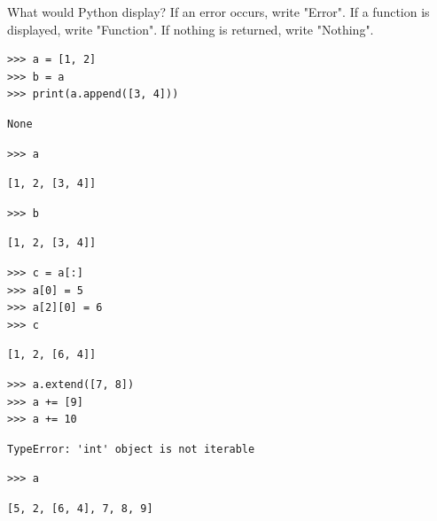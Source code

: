 \begin{blocksection}
\question What would Python display? If an error occurs, write "Error". If a function is displayed, write "Function". If nothing is returned, write "Nothing".

\begin{lstlisting}
>>> a = [1, 2]
>>> b = a
>>> print(a.append([3, 4]))
\end{lstlisting}
\begin{solution}[0.25in]
\begin{lstlisting}
None
\end{lstlisting}
\end{solution}

\begin{lstlisting}
>>> a
\end{lstlisting}
\begin{solution}[0.25in]
\begin{lstlisting}
[1, 2, [3, 4]]
\end{lstlisting}
\end{solution}

\begin{lstlisting}
>>> b
\end{lstlisting}
\begin{solution}[0.25in]
\begin{lstlisting}
[1, 2, [3, 4]]
\end{lstlisting}
\end{solution}

\begin{lstlisting}
>>> c = a[:]
>>> a[0] = 5
>>> a[2][0] = 6
>>> c
\end{lstlisting}
\begin{solution}[0.25in]
\begin{lstlisting}
[1, 2, [6, 4]]
\end{lstlisting}
\end{solution}

\begin{lstlisting}
>>> a.extend([7, 8])
>>> a += [9]
>>> a += 10
\end{lstlisting}
\begin{solution}[0.25in]
\begin{lstlisting}
TypeError: 'int' object is not iterable
\end{lstlisting}
\end{solution}

\begin{lstlisting}
>>> a
\end{lstlisting}
\begin{solution}[0.25in]
\begin{lstlisting}
[5, 2, [6, 4], 7, 8, 9]
\end{lstlisting}
\end{solution}
\end{blocksection}
